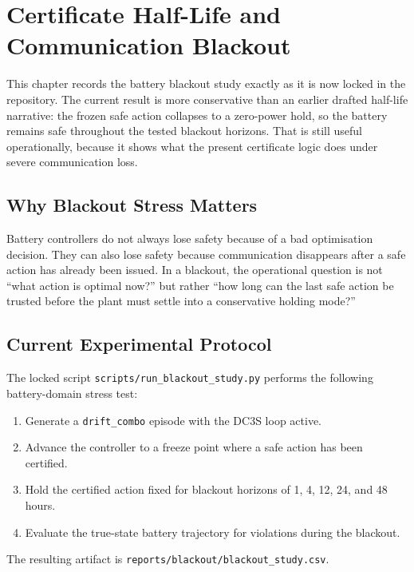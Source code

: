 \chapter{Certificate Half-Life and Communication Blackout}
\label{ch:cert-half-life-blackout}

This chapter records the battery blackout study exactly as it is now locked
in the repository.  The current result is more conservative than an earlier
drafted half-life narrative: the frozen safe action collapses to a zero-power
hold, so the battery remains safe throughout the tested blackout horizons.
That is still useful operationally, because it shows what the present
certificate logic does under severe communication loss.

\section{Why Blackout Stress Matters}

Battery controllers do not always lose safety because of a bad optimisation
decision.  They can also lose safety because communication disappears after a
safe action has already been issued.  In a blackout, the operational question
is not ``what action is optimal now?'' but rather ``how long can the last
safe action be trusted before the plant must settle into a conservative
holding mode?''

\section{Current Experimental Protocol}

The locked script \texttt{scripts/run\_blackout\_study.py} performs the
following battery-domain stress test:

\begin{enumerate}
  \item Generate a \texttt{drift\_combo} episode with the DC3S loop active.
  \item Advance the controller to a freeze point where a safe action has been
    certified.
  \item Hold the certified action fixed for blackout horizons of
    1, 4, 12, 24, and 48 hours.
  \item Evaluate the true-state battery trajectory for violations during the
    blackout.
\end{enumerate}

The resulting artifact is \texttt{reports/blackout/blackout\_study.csv}.

